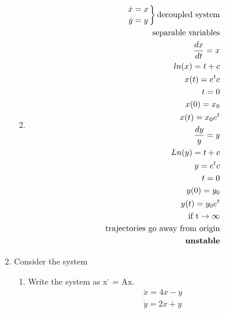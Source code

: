 \documentclass[a4paper,10pt]{article}
\begin{document}
\begin{enumerate}
\begin{enumerate}
\begin{equation}
\begin{aligned}
                    \end{aligned}
                \end{equation}
            \item 
                \begin{equation}
                    \begin{aligned}
                        \left.
                        \dot{x}=x \atop
                        \dot{y}= y
                        \right\}{\text{decoupled system}}\\
                        \text{separable variables}\\
                        \frac{dx}{dt}= x\\
                        ln(x)= t+c\\
                        x(t)= e^{t}c\\
                        t=0\\
                        x(0)=x_{0}\\
                        x(t)=x_{0}e^{t}\\
                        \frac{dy}{y}= y\\
                        Ln(y)= t +c\\
                        y= e^{t}c\\
                        t=0\\
                        y(0)= y_{0}\\
                        y(t)=y_{0}e^{t}\\
                        \text{if t}\to \infty\\
                        \text{trajectories go away from origin}\\
                        \textbf{unstable}
                    \end{aligned}
                \end{equation}
        \end{enumerate}
    \item Consider the system
        \begin{enumerate}
            \item Write the system as x˙ = Ax.
                \begin{equation}
                    \begin{aligned}
                        \dot{x}= 4x-y\\
                        \dot{y}= 2x +y
                    \end{aligned}
                \end{equation}

\end{enumerate}
\end{enumerate}
\end{document}

